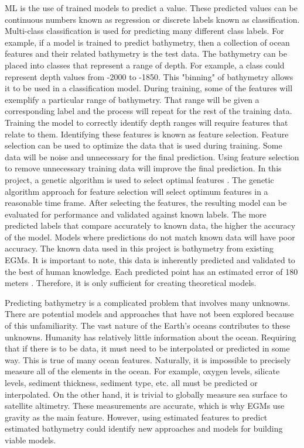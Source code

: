 \par
\ac{ML} is the use of trained models to predict a value.
These predicted values can be continuous numbers known as regression or discrete labels known as classification.
Multi-class classification is used for predicting many different class labels.
For example, if a model is trained to predict bathymetry, then a collection of ocean features and their related bathymetry is the test data.
The bathymetry can be placed into classes that represent a range of depth.
For example, a class could represent depth values from -2000 to -1850.
This "binning" of bathymetry allows it to be used in a classification model.
During training, some of the features will exemplify a particular range of bathymetry.
That range will be given a corresponding label and the process will repeat for the rest of the training data.
Training the model to correctly identify depth ranges will require features that relate to them.
Identifying these features is known as feature selection.
Feature selection can be used to optimize the data that is used during training.
Some data will be noise and unnecessary for the final prediction.
Using feature selection to remove unnecessary training data will improve the final prediction.
In this project, a genetic algorithm is used to select optimal features \cite{yang1998feature}.
The genetic algorithm approach for feature selection will select optimum features in a reasonable time frame.
After selecting the features, the resulting model can be evaluated for performance and validated against known labels.
The more predicted labels that compare accurately to known data, the higher the accuracy of the model.
Models where predictions do not match known data will have poor accuracy.
The known data used in this project is bathymetry from existing \ac{EGM}s.
It is important to note, this data is inherently predicted and validated to the best of human knowledge.
Each predicted point has an estimated error of 180 meters \cite{becker2009global}. 
Therefore, it is only sufficient for creating theoretical models.

\par
Predicting bathymetry is a complicated problem that involves many unknowns.
There are potential models and approaches that have not been explored because of this unfamiliarity.
The vast nature of the Earth's oceans contributes to these unknowns.
Humanity has relatively little information about the ocean.
Requiring that if there is to be data, it must need to be interpolated or predicted in some way.
This is true of many ocean features.
Naturally, it is impossible to precisely measure all of the elements in the ocean.
For example, oxygen levels, silicate levels, sediment thickness, sediment type, etc. all must be predicted or interpolated.
On the other hand, it is trivial to globally measure sea surface to satellite altimetry.
These measurements are accurate, which is why \ac{EGM}s use gravity as the main feature.
However, using estimated features to predict estimated bathymetry could identify new approaches and models for building viable models.

